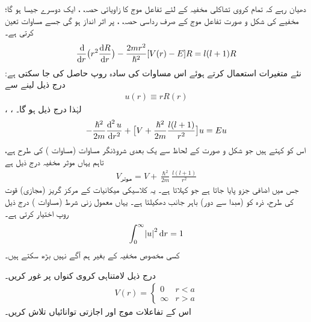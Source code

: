 دھیان رہے کہ تمام کروی تشاکلی  مخفیہ کے لئے تفاعل موج کا زاویائی حصہ، ،  ایک  دوسرے جیسا ہو گا؛ مخفیے 
 کی شکل و صورت تفاعل موج کے صرف رداسی حصہ، ، پر اثر انداز ہو گی جسے مساوات  تعین کرتی ہے۔
\begin{align}
\frac{\dif}{\dif r}\big(r^{2}\frac{\dif R}{\dif r}\big)-\frac{2mr^{2}}{\hslash^{2}}[V(r)-E]R=l(l+1)R
\end{align}
نئے متغیرات استعمال کرتے ہوئے اس مساوات کی سادہ روپ حاصل کی جا سکتی ہے: درج ذیل لینے سے
\begin{align}
u(r)\equiv{rR(r)} 
\end{align}  
، ،   لہٰذا درج ذیل ہو گا۔
\begin{align}
-\frac{\hslash^{2}}{2m}\frac{\dif^{\,2}u}{\dif r^{2}}+\big[V+\frac{\hslash^{2}}{2m}\frac{l(l+1)}{r^{2}}\big]u=Eu
\end{align}
اس کو  کہتے ہیں جو شکل و صورت کے لحاظ سے یک بعدی شروڈنگر مساوات (مساوات ) کی طرح ہے، تاہم یہاں موثر مخفیہ درج ذیل ہے
\begin{align}
V_{\text{موثر}}=V+\frac{\hslash^{2}}{2m}\frac{l(l+1)}{r^{2}} 
\end{align}
 جس میں   اضافی جزو پایا جاتا ہے جو  کہلاتا ہے۔ یہ کلاسیکی میکانیات کے مرکز گریز (مجازی) قوت کی طرح، ذرہ کو (مبدا سے دور) باہر جانب دھکیلتا ہے۔ یہاں معمول زنی شرط (مساوات ) درج ذیل روپ اختیار کرتی ہے۔ 
\begin{align}
\int_{0}^{\infty}\abs{u}^{2}\dif r=1 
\end{align}
کسی مخصوص مخفیہ    کے بغیر ہم آگے نہیں بڑھ سکتے ہیں۔

درج ذیل لامتناہی کروی کنواں پر غور کریں۔
\begin{align}
V(r)=\begin{cases}
0&r<{a}\\
\infty&r>a
\end{cases} 
\end{align}
اس کے تفاعلات موج اور اجازتی توانائیاں تلاش کریں۔

